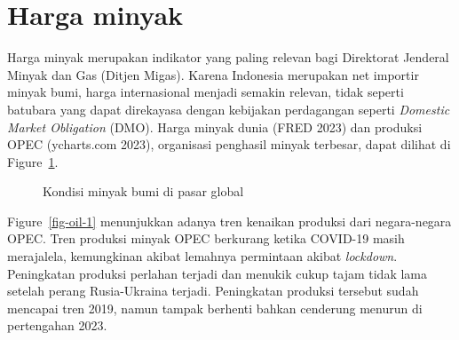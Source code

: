 \documentclass[
  a4paper,
  DIV=11,
  numbers=noendperiod]{scrreprt}
\begin{document}
\hypertarget{harga-minyak}{%
\section{Harga minyak}\label{harga-minyak}}

Harga minyak merupakan indikator yang paling relevan bagi Direktorat
Jenderal Minyak dan Gas (Ditjen Migas). Karena Indonesia merupakan net
importir minyak bumi, harga internasional menjadi semakin relevan, tidak
seperti batubara yang dapat direkayasa dengan kebijakan perdagangan
seperti \emph{Domestic Market Obligation} (DMO). Harga minyak dunia
(FRED 2023) dan produksi OPEC (ycharts.com 2023), organisasi penghasil
minyak terbesar, dapat dilihat di Figure~\ref{fig-oil}.

\begin{figure}

\begin{minipage}[t]{0.50\linewidth}

{\centering 


}

\end{minipage}%
%
\begin{minipage}[t]{0.50\linewidth}

{\centering 


}

\end{minipage}%

\caption{\label{fig-oil}Kondisi minyak bumi di pasar global}

\end{figure}

Figure~\ref{fig-oil-1} menunjukkan adanya tren kenaikan produksi dari
negara-negara OPEC. Tren produksi minyak OPEC berkurang ketika COVID-19
masih merajalela, kemungkinan akibat lemahnya permintaan akibat
\emph{lockdown}. Peningkatan produksi perlahan terjadi dan menukik cukup
tajam tidak lama setelah perang Rusia-Ukraina terjadi. Peningkatan
produksi tersebut sudah mencapai tren 2019, namun tampak berhenti bahkan
cenderung menurun di pertengahan 2023.
\end{document}
